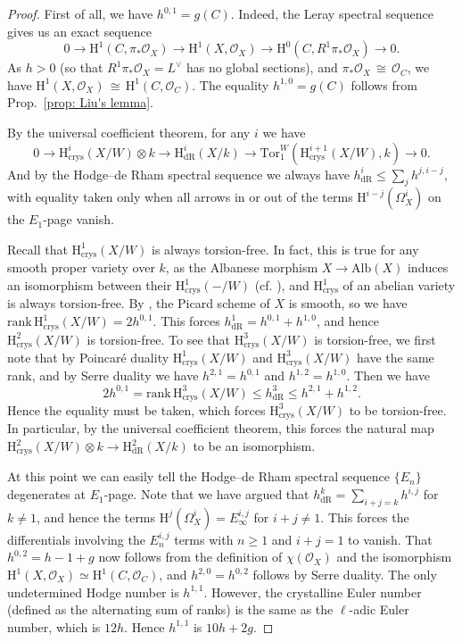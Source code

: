 \documentclass[11pt, letterpaper]{amsart}
\theoremstyle{plain}
\theoremstyle{definition}
\newcommand\iso{\,{\cong}\,}
\newcommand\tensor{{\otimes}}
\newcommand{\<}{\langle}
\renewcommand{\>}{\rangle}
\newcommand{\Ohm}{\Omega}
\newcommand{\sO}{\mathcal{O}}
\renewcommand{\H}{\mathrm{H}}
\newcommand{\crys}{\mathrm{crys}}
\newcommand{\dR}{\mathrm{dR}}
\begin{document}
\begin{proof} 
First of all, we have $h^{0, 1} = g(C)$. 
Indeed, the Leray spectral sequence gives us an exact sequence 
$$ 0 \to \H^1(C, \pi_* \sO_X) \to \H^1(X, \sO_X) \to \H^0(C, R^1 \pi_* \sO_X) \to 0. $$
As $h > 0$ (so that $R^1 \pi_* \sO_X = L^\vee$ has no global sections), and $\pi_* \sO_X \iso \sO_C$, we have $\H^1(X, \sO_X) \iso \H^1(C, \sO_C)$. 
The equality $h^{1,0} = g(C)$ follows from Prop.~\ref{prop: Liu's lemma}. 

By the universal coefficient theorem, for any $i$ we have 
$$ 0 \to \H^i_\crys(X/W) \tensor k \to \H^i_\dR(X/k) \to \mathrm{Tor}_1^W(\H^{i + 1}_\crys(X/W), k) \to 0. $$
And by the Hodge--de Rham spectral sequence we always have $h_\dR^i \le \sum_j h^{j, i - j}$, with equality taken only when all arrows in or out of the terms $\H^{i - j}(\Ohm_X^i)$ on the $E_1$-page vanish. 

Recall that $\H^1_\crys(X/W)$ is always torsion-free. In fact, this is true for any smooth proper variety over $k$, as the Albanese morphism $X \to \mathrm{Alb}(X)$ induces an isomorphism between their $\H^1_\crys(-/W)$ (cf. \cite[II, Remarque~3.11.2]{Illusie}), and $\H^1_\crys$ of an abelian variety is always torsion-free. 
By \cite[Prop.~2.1(1)]{Liedtke}, the Picard scheme of $X$ is smooth, so we have $\mathrm{rank\,} \H^1_\crys(X/W) = 2 h^{0, 1}$. This forces $h^1_\dR = h^{0, 1} + h^{1, 0}$, and hence $\H^2_\crys(X/W)$ is torsion-free. To see that $\H^3_\crys(X/W)$ is torsion-free, we first note that by Poincar\'e duality $\H^1_\crys(X/W)$ and $\H^3_\crys(X/W)$ have the same rank, and by Serre duality we have $h^{2, 1} = h^{0, 1}$ and $h^{1, 2} = h^{1, 0}$. Then we have $$2 h^{0, 1} = \mathrm{rank\,} \H^3_\crys(X/W) \le h^3_\dR \le h^{2, 1} + h^{1, 2}.$$
Hence the equality must be taken, which forces $\H^3_\crys(X/W)$ to be torsion-free. 
In particular, by the universal coefficient theorem, this forces the natural map $\H^2_\crys(X/W) \tensor k \to \H^2_\dR(X/k)$ to be an isomorphism.

At this point we can easily tell the Hodge--de Rham spectral sequence $\{E_n\}$ degenerates at $E_1$-page.
Note that we have argued that $h^{k}_\dR = \sum_{i + j = k} h^{i, j}$ for $k \neq 1$, and hence the terms $\H^{j}(\Omega_X^i) = E_\infty^{i, j}$ for $i + j \neq 1$. 
This forces the differentials involving the $E_n^{i, j}$ terms with $n \ge 1$ and $i + j = 1$ to vanish.
That $h^{0, 2} = h - 1 + g$ now follows from the definition of $\chi(\sO_X)$ and the isomorphism $\H^1(X,\sO_X)\simeq \H^1(C,\sO_C)$, and $h^{2, 0} = h^{0, 2}$ follows by Serre duality. 
The only undetermined Hodge number is $h^{1, 1}$. 
However, the crystalline Euler number (defined as the alternating sum of ranks) is the same as the $\ell$-adic Euler number, which is $12 h$.
Hence $h^{1,1}$ is $10h + 2g$. 
\end{proof}
\end{document}
